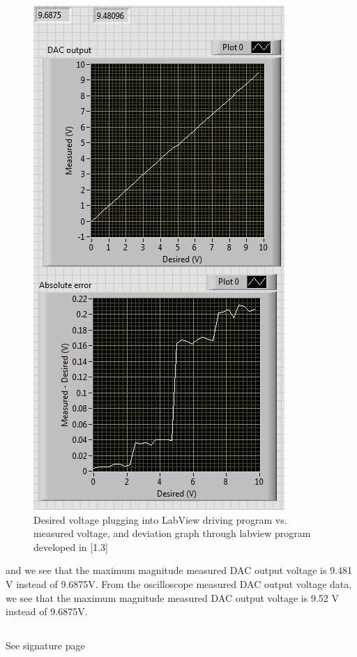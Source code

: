 \documentclass{article}
\begin{document}
    \begin{figure}[H]
        \centering
        \includegraphics[scale = 0.5]{2c.jpeg}
        \caption{Desired voltage plugging into LabView driving program vs. measured voltage, and deviation graph through labview program developed in [1.3] \cite{lab10}}
        \label{fig:my_label}
    \end{figure}
    and we see that the maximum magnitude measured DAC output voltage is 9.481 V instead of 9.6875V. From the oscilloscope measured DAC output voltage data, we see that the maximum magnitude measured DAC output voltage is 9.52 V instead of 9.6875V.
    
    
\subsection{}
    See signature page
    
\end{document}

